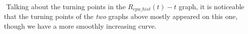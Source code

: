 \documentclass[12pt]{article}  %
\begin{document}
​		Talking about the turning points in the $R_{epu\_hist}(t)-t$ graph, it is noticeable that the turning points of the \emph{two} graphs above mostly appeared on this one, though we have a more smoothly increasing curve.

\end{document}
